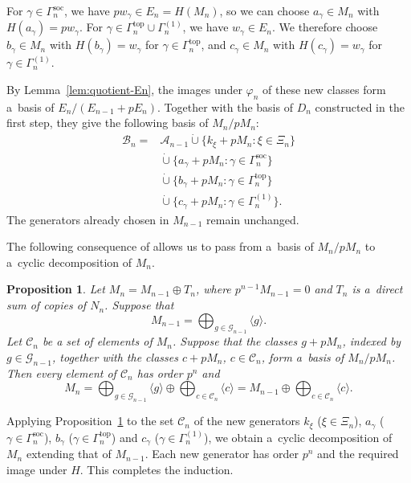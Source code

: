\documentclass[11pt]{article}
\newtheorem{prop}[thm]{Proposition}
\theoremstyle{definition}
\begin{document}
For $\gamma\in\Gamma_n^{\mathrm{soc}}$, we have
$pw_\gamma\in E_n=H(M_n)$, so we can choose
$a_\gamma\in M_n$ with $H(a_\gamma)=pw_\gamma$.
For $\gamma\in\Gamma_n^{\mathrm{top}}\cup\Gamma_n^{(1)}$,
we have $w_\gamma\in E_n$. We therefore choose
$b_\gamma\in M_n$ with $H(b_\gamma)=w_\gamma$
for $\gamma\in\Gamma_n^{\mathrm{top}}$, and
$c_\gamma\in M_n$ with $H(c_\gamma)=w_\gamma$
for $\gamma\in\Gamma_n^{(1)}$.

By Lemma~\ref{lem:quotient-En}, the images under $\varphi_n$
of these new classes form a~basis of $E_n/(E_{n-1}+pE_n)$.
Together with the basis of $D_n$ constructed in the first step,
they give the following basis of $M_n/pM_n$:
$$
\begin{aligned}
	\mathcal B_n={}&
	\mathcal A_{n-1}
	\mathbin{\dot\cup}
	\{k_\xi+pM_n:\xi\in \Xi_n\}\\
	&\mathbin{\dot\cup}
	\{a_\gamma+pM_n:\gamma\in\Gamma_n^{\mathrm{soc}}\}\\
	&\mathbin{\dot\cup}
	\{b_\gamma+pM_n:\gamma\in\Gamma_n^{\mathrm{top}}\}\\
	&\mathbin{\dot\cup}
	\{c_\gamma+pM_n:\gamma\in\Gamma_n^{(1)}\}.
\end{aligned}
$$
The generators already chosen in $M_{n-1}$ remain unchanged.

The following consequence of \cite[Lemma~2.2 and Proposition 2.3]{kss-SH1}
allows us to pass from a~basis of $M_n/pM_n$
to a~cyclic decomposition of $M_n$.

\begin{prop}\label{prop-lifting} 	Let $M_n=M_{n-1}\oplus T_n$, where $p^{n-1}M_{n-1}=0$
	and $T_n$ is a~direct sum of copies of $N_n$. Suppose that
	$$
	M_{n-1}=\bigoplus_{g\in\mathcal G_{n-1}}\langle g\rangle.
	$$
		Let $\mathcal C_n$ be a set of elements of $M_n$.
	Suppose that the classes $g+pM_n$, indexed by
	$g\in\mathcal G_{n-1}$, together with the classes
	$c+pM_n$, $c\in\mathcal C_n$, form a~basis of $M_n/pM_n$.
	Then every element of $\mathcal C_n$ has order $p^n$ and
	$$
	M_n=
	\bigoplus_{g\in\mathcal G_{n-1}}\langle g\rangle
	\oplus
	\bigoplus_{c\in \mathcal C_n}\langle c\rangle=M_{n-1}\oplus
	\bigoplus_{c\in \mathcal C_n}\langle c\rangle.
	$$
\end{prop}



Applying Proposition~\ref{prop-lifting} to the set
$\mathcal C_n$ of the new generators $k_\xi$ ($\xi\in\Xi_n$), $a_\gamma$
	($\gamma\in\Gamma^{\mathrm{soc}}_n$), $b_\gamma$ ($\gamma\in\Gamma^{\mathrm{top}}_n$) and
	$c_\gamma$ ($\gamma\in\Gamma^{(1)}_n$),
we obtain a~cyclic decomposition of $M_n$ extending that
of $M_{n-1}$. Each new generator has order $p^n$
and the required image under $H$. This completes
the induction.
\end{document}
